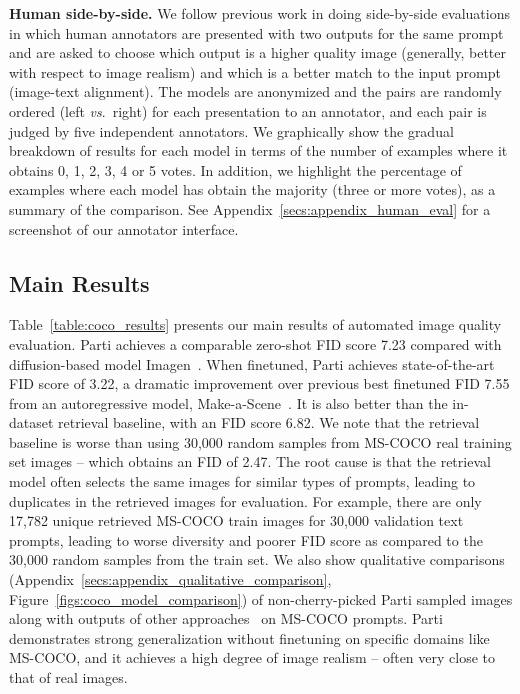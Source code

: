 \textbf{Human side-by-side.} We follow previous work \cite{zhang2021cross, ramesh2021zero} in doing side-by-side evaluations in which human annotators are presented with two outputs for the same prompt and are asked to choose which output is a higher quality image (generally, better with respect to image realism) and which is a better match to the input prompt (image-text alignment). The models are anonymized and the pairs are randomly ordered (left \emph{vs}.\ right) for each presentation to an annotator, and each pair is judged by five independent annotators. We graphically show the gradual breakdown of results for each model in terms of the number of examples where it obtains 0, 1, 2, 3, 4 or 5 votes. In addition, we highlight the percentage of examples where each model has obtain the majority (three or more votes), as a summary of the comparison. See Appendix~\ref{secs:appendix_human_eval} for a screenshot of our annotator interface.

\subsection{Main Results} \label{secs:main_results}

Table~\ref{table:coco_results} presents our main results of automated image quality evaluation. Parti achieves a comparable zero-shot FID score 7.23 compared with diffusion-based model Imagen~\cite{imagen}. When finetuned, Parti achieves state-of-the-art FID score of 3.22, a dramatic improvement over previous best finetuned FID 7.55 from an autoregressive model, Make-a-Scene~\cite{gafni2022make}. It is also better than the in-dataset retrieval baseline, with an FID score 6.82. We note that the retrieval baseline is worse than using 30,000 random samples from MS-COCO real training set images -- which obtains an FID of 2.47. The root cause is that the retrieval model often selects the same images for similar types of prompts, leading to duplicates in the retrieved images for evaluation. For example, there are only 17,782 unique retrieved MS-COCO train images for 30,000 validation text prompts, leading to worse diversity and poorer FID score as compared to the 30,000 random samples from the train set. We also show qualitative comparisons (Appendix~\ref{secs:appendix_qualitative_comparison}, Figure~\ref{figs:coco_model_comparison}) of non-cherry-picked Parti sampled images along with outputs of other approaches~\cite{ramesh2021zero, nichol2021glide, gafni2022make, ramesh2022hierarchical} on MS-COCO prompts. Parti demonstrates strong generalization without finetuning on specific domains like MS-COCO, and it achieves a high degree of image realism -- often very close to that of real images.

